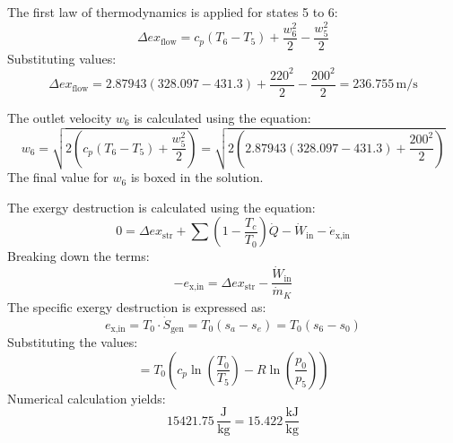The first law of thermodynamics is applied for states 5 to 6:  
\[
\Delta ex_{\text{flow}} = c_p (T_6 - T_5) + \frac{w_6^2}{2} - \frac{w_5^2}{2}
\]  
Substituting values:  
\[
\Delta ex_{\text{flow}} = 2.87943 (328.097 - 431.3) + \frac{220^2}{2} - \frac{200^2}{2} = 236.755 \, \text{m/s}
\]  

The outlet velocity \( w_6 \) is calculated using the equation:  
\[
w_6 = \sqrt{2 \left( c_p (T_6 - T_5) + \frac{w_5^2}{2} \right)} = \sqrt{2 \left( 2.87943 (328.097 - 431.3) + \frac{200^2}{2} \right)}
\]  
The final value for \( w_6 \) is boxed in the solution.

The exergy destruction is calculated using the equation:  
\[
0 = \Delta ex_{\text{str}} + \sum \left(1 - \frac{T_c}{T_0}\right) \dot{Q} - \dot{W}_{\text{in}} - \dot{e}_{\text{x,in}}
\]  
Breaking down the terms:  
\[
-e_{\text{x,in}} = \Delta ex_{\text{str}} - \frac{\dot{W}_{\text{in}}}{\dot{m}_K}
\]  
The specific exergy destruction is expressed as:  
\[
e_{\text{x,in}} = T_0 \cdot \dot{S}_{\text{gen}} = T_0 \left(s_a - s_e\right) = T_0 \left(s_6 - s_0\right)
\]  
Substituting the values:  
\[
= T_0 \left(c_p \ln\left(\frac{T_0}{T_5}\right) - R \ln\left(\frac{p_0}{p_5}\right)\right)
\]  
Numerical calculation yields:  
\[
15421.75 \, \frac{\text{J}}{\text{kg}} = 15.422 \, \frac{\text{kJ}}{\text{kg}}
\]